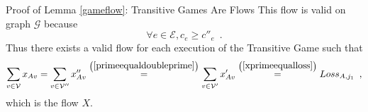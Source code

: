 \begin{sepproof}{Proof of Lemma \ref{gameflow}: Transitive Games Are Flows}
   This flow is valid on graph $\mathcal{G}$ because
   \begin{equation*}
      \forall e \in \mathcal{E}, c_e \geq c''_e \enspace.
   \end{equation*}
   Thus there exists a valid flow for each execution of the Transitive Game such that
   \begin{equation*}
      \sum\limits_{v \in \mathcal{V}}x_{Av} = \sum\limits_{v \in \mathcal{V}''}x''_{Av}
      \overset{\left(\ref{primeequaldoubleprime}\right)}{=} \sum\limits_{v \in \mathcal{V}'}x'_{Av}
      \overset{\left(\ref{xprimeequalloss}\right)}{=} Loss_{A, j_1} \enspace,
   \end{equation*}
   which is the flow $X$.
\end{sepproof}
